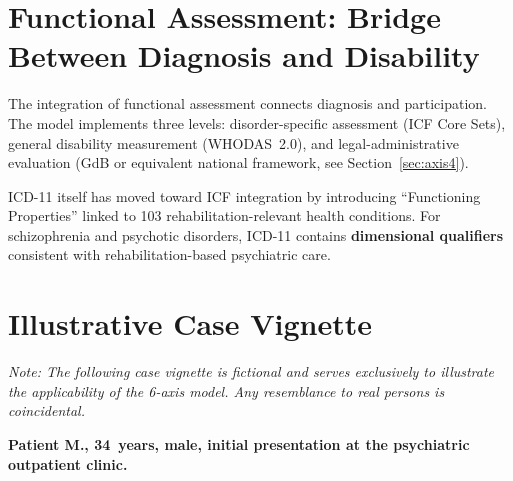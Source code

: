 \documentclass[11pt,a4paper]{article}
\begin{document}
\section{Functional Assessment: Bridge Between Diagnosis and Disability}
\label{sec:functional}

The integration of functional assessment connects diagnosis and participation. The model implements three levels: disorder-specific assessment (ICF Core Sets), general disability measurement (WHODAS~2.0), and legal-administrative evaluation (GdB or equivalent national framework, see Section~\ref{sec:axis4}).

ICD-11 itself has moved toward ICF integration by introducing ``Functioning Properties'' linked to 103 rehabilitation-relevant health conditions. For schizophrenia and psychotic disorders, ICD-11 contains \textbf{dimensional qualifiers} consistent with rehabilitation-based psychiatric care.

\section{Illustrative Case Vignette}
\label{sec:vignette}

\textit{Note: The following case vignette is fictional and serves exclusively to illustrate the applicability of the 6-axis model. Any resemblance to real persons is coincidental.}

\vspace{0.5em}
\noindent \textbf{Patient M., 34~years, male, initial presentation at the psychiatric outpatient clinic.}
\end{document}
